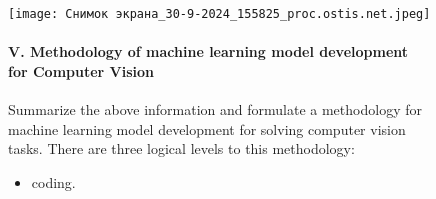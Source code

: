 \documentclass{article}
\begin{document}
\begin{figure}[h]
\begin{multicols}{2}
\texttt{[image: Снимок экрана\_30-9-2024\_155825\_proc.ostis.net.jpeg]}


   
\paragraph{V. Methodology of machine learning model
development for Computer Vision
}


Summarize the above information and formulate a
methodology for machine learning model development
for solving computer vision tasks. There are three logical
levels to this methodology:
\begin{itemize}
    \item 
coding.
\end{itemize}




\end{multicols} 
\end{figure}
\end{document}
